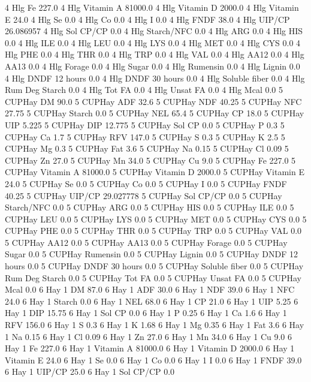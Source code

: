 \documentclass[letterpaper,10pt,english]{sphinxmanual}
\begin{document}
\begin{sphinxVerbatim}[commandchars=\\\{\},numbers=left,firstnumber=1,stepnumber=1]
4 Hlg Fe 227.0
4 Hlg Vitamin A 81000.0
4 Hlg Vitamin D 2000.0
4 Hlg Vitamin E 24.0
4 Hlg Se 0.0
4 Hlg Co 0.0
4 Hlg I 0.0
4 Hlg FNDF 38.0
4 Hlg UIP/CP 26.086957
4 Hlg Sol CP/CP 0.0
4 Hlg Starch/NFC 0.0
4 Hlg ARG 0.0
4 Hlg HIS 0.0
4 Hlg ILE 0.0
4 Hlg LEU 0.0
4 Hlg LYS 0.0
4 Hlg MET 0.0
4 Hlg CYS 0.0
4 Hlg PHE 0.0
4 Hlg THR 0.0
4 Hlg TRP 0.0
4 Hlg VAL 0.0
4 Hlg AA\PYGZsh{}12 0.0
4 Hlg AA\PYGZsh{}13 0.0
4 Hlg \PYGZpc{} Forage 0.0
4 Hlg Sugar \PYGZpc{} 0.0
4 Hlg Rumensin 0.0
4 Hlg Lignin 0.0
4 Hlg DNDF 12 hours 0.0
4 Hlg DNDF 30 hours 0.0
4 Hlg Soluble fiber 0.0
4 Hlg Rum Deg Starch 0.0
4 Hlg Tot FA 0.0
4 Hlg Unsat FA 0.0
4 Hlg Mcal 0.0
5 CUPHay DM 90.0
5 CUPHay ADF 32.6
5 CUPHay NDF 40.25
5 CUPHay NFC 27.75
5 CUPHay Starch 0.0
5 CUPHay NEL 65.4
5 CUPHay CP 18.0
5 CUPHay UIP 5.225
5 CUPHay DIP 12.775
5 CUPHay Sol CP 0.0
5 CUPHay P 0.3
5 CUPHay Ca 1.7
5 CUPHay RFV 147.0
5 CUPHay S 0.3
5 CUPHay K 2.5
5 CUPHay Mg 0.3
5 CUPHay Fat 3.6
5 CUPHay Na 0.15
5 CUPHay Cl 0.09
5 CUPHay Zn 27.0
5 CUPHay Mn 34.0
5 CUPHay Cu 9.0
5 CUPHay Fe 227.0
5 CUPHay Vitamin A 81000.0
5 CUPHay Vitamin D 2000.0
5 CUPHay Vitamin E 24.0
5 CUPHay Se 0.0
5 CUPHay Co 0.0
5 CUPHay I 0.0
5 CUPHay FNDF 40.25
5 CUPHay UIP/CP 29.027778
5 CUPHay Sol CP/CP 0.0
5 CUPHay Starch/NFC 0.0
5 CUPHay ARG 0.0
5 CUPHay HIS 0.0
5 CUPHay ILE 0.0
5 CUPHay LEU 0.0
5 CUPHay LYS 0.0
5 CUPHay MET 0.0
5 CUPHay CYS 0.0
5 CUPHay PHE 0.0
5 CUPHay THR 0.0
5 CUPHay TRP 0.0
5 CUPHay VAL 0.0
5 CUPHay AA\PYGZsh{}12 0.0
5 CUPHay AA\PYGZsh{}13 0.0
5 CUPHay \PYGZpc{} Forage 0.0
5 CUPHay Sugar \PYGZpc{} 0.0
5 CUPHay Rumensin 0.0
5 CUPHay Lignin 0.0
5 CUPHay DNDF 12 hours 0.0
5 CUPHay DNDF 30 hours 0.0
5 CUPHay Soluble fiber 0.0
5 CUPHay Rum Deg Starch 0.0
5 CUPHay Tot FA 0.0
5 CUPHay Unsat FA 0.0
5 CUPHay Mcal 0.0
6 Hay \PYGZsh{}1 DM 87.0
6 Hay \PYGZsh{}1 ADF 30.0
6 Hay \PYGZsh{}1 NDF 39.0
6 Hay \PYGZsh{}1 NFC 24.0
6 Hay \PYGZsh{}1 Starch 0.0
6 Hay \PYGZsh{}1 NEL 68.0
6 Hay \PYGZsh{}1 CP 21.0
6 Hay \PYGZsh{}1 UIP 5.25
6 Hay \PYGZsh{}1 DIP 15.75
6 Hay \PYGZsh{}1 Sol CP 0.0
6 Hay \PYGZsh{}1 P 0.25
6 Hay \PYGZsh{}1 Ca 1.6
6 Hay \PYGZsh{}1 RFV 156.0
6 Hay \PYGZsh{}1 S 0.3
6 Hay \PYGZsh{}1 K 1.68
6 Hay \PYGZsh{}1 Mg 0.35
6 Hay \PYGZsh{}1 Fat 3.6
6 Hay \PYGZsh{}1 Na 0.15
6 Hay \PYGZsh{}1 Cl 0.09
6 Hay \PYGZsh{}1 Zn 27.0
6 Hay \PYGZsh{}1 Mn 34.0
6 Hay \PYGZsh{}1 Cu 9.0
6 Hay \PYGZsh{}1 Fe 227.0
6 Hay \PYGZsh{}1 Vitamin A 81000.0
6 Hay \PYGZsh{}1 Vitamin D 2000.0
6 Hay \PYGZsh{}1 Vitamin E 24.0
6 Hay \PYGZsh{}1 Se 0.0
6 Hay \PYGZsh{}1 Co 0.0
6 Hay \PYGZsh{}1 I 0.0
6 Hay \PYGZsh{}1 FNDF 39.0
6 Hay \PYGZsh{}1 UIP/CP 25.0
6 Hay \PYGZsh{}1 Sol CP/CP 0.0

\end{sphinxVerbatim}
\end{document}
